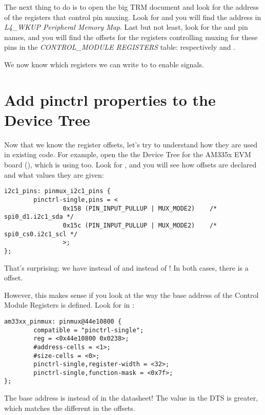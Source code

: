 The next thing to do is to open the big TRM document and look for the
address of the registers that control pin muxing. Look for
 and you will find the 
address in {\em L4\_WKUP Peripheral Memory Map}.
Last but not least, look for the  and  
pin names, and you will find the offsets for the registers controlling
muxing for these pins in the {\em CONTROL\_MODULE REGISTERS} table:
respectively  and .

We now know which registers we can write to to enable 
signals.

\section{Add pinctrl properties to the Device Tree}

Now that we know the register offsets, let's try to understand
how they are used in existing code. For example, open the
the Device Tree for the AM335x EVM board
(), which is using
 too. Look for , and you will see how
offsets are declared and what values they are given:

\begin{verbatim}
i2c1_pins: pinmux_i2c1_pins {
        pinctrl-single,pins = <
                0x158 (PIN_INPUT_PULLUP | MUX_MODE2)    /* spi0_d1.i2c1_sda */
                0x15c (PIN_INPUT_PULLUP | MUX_MODE2)    /* spi0_cs0.i2c1_scl */
                >;
};
\end{verbatim}

That's surprising: we have  instead of 
and  instead of ! In both cases, there is a
 offset.

However, this makes sense if you look at the way the base address of the 
Control Module Registers is defined. Look for  in
:

\begin{verbatim}
am33xx_pinmux: pinmux@44e10800 {
        compatible = "pinctrl-single";
        reg = <0x44e10800 0x0238>;
        #address-cells = <1>;
        #size-cells = <0>;
        pinctrl-single,register-width = <32>;
        pinctrl-single,function-mask = <0x7f>;
};
\end{verbatim}

The base address is  instead of  in
the datasheet! The value in the DTS is  greater, which
matches the different in the offsets.

